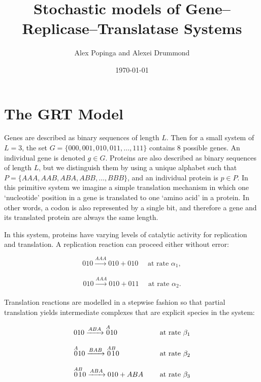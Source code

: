 \documentclass{article}
\begin{document}
\title{Stochastic models of Gene--Replicase--Translatase Systems}
\author{Alex Popinga and Alexei Drummond}
\date{\today}
\maketitle

\section{The GRT Model}

Genes are described as binary sequences of length $L$.  Then for a small system of $L=3$, the set $G = \{000, 001, 010, 011, \dots, 111\}$ contains 8 possible genes.  An individual gene is denoted $g \in G$. Proteins are also described as binary sequences of length $L$, but we distinguish them by using a unique alphabet such that $P = \{AAA, AAB, ABA, ABB, \dots, BBB\}$, and an individual protein is $p \in P$. 
In this primitive system we imagine a simple translation mechanism in which one `nucleotide' position in a gene is translated to one `amino acid' in a protein.  In other words, a codon is also represented by a single bit, and therefore a gene and its translated protein are always the same length.

In this system, proteins have varying levels of catalytic activity for replication and translation. A replication reaction can proceed either without error:

\begin{equation}
010 \xrightarrow[]{AAA} 010 + 010\quad \text{ at rate } \alpha_1,
\label{eq:basicRep}
\end{equation}


\begin{equation}
010 \xrightarrow[]{AAA} 010 + 011\quad \text{ at rate } \alpha_2.
\label{eq:basicError}
\end{equation}


Translation reactions are modelled in a stepwise fashion so that partial translation yields intermediate complexes that are explicit species in the system: 

\begin{equation}
 \begin{array}{l l}
010 \xrightarrow[]{ABA} \overset{A}010 & \quad \text{ at rate } \beta_1 \\
\\
\overset{A}010 \xrightarrow[]{BAB} \overset{A}0\overset{B}10 & \quad \text{ at rate } \beta_2\\
\\
\overset{A}0\overset{B}10 \xrightarrow[]{ABA} 010 + ABA & \quad \text{ at rate } \beta_3
\end{array}
\label{eq:basicTrans}
\end{equation}
\end{document}

